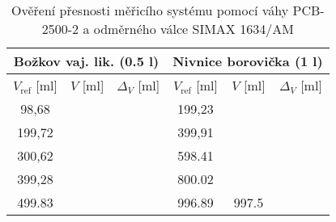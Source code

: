

\begin{table}[h]
    \centering
    \begin{tabular}{|c|c|c|c|c|c|}
        \hline
        \multicolumn{3}{|c|}{Božkov vaj. lik. (0.5 l)} & \multicolumn{3}{c|}{Nivnice borovička (1 l)} \\ \hline
        $V_{\text{ref}}$ [ml] & $V$ [ml] & $\Delta_V$ [ml] & $V_{\text{ref}}$ [ml] & $V$ [ml] & $\Delta_V$ [ml] \\ \hline \hline
        98,68 & & & 199,23 & & \\ \hline
        199,72 & & & 399,91 & & \\ \hline
        300,62 & & & 598.41 & & \\ \hline
        399,28 & & & 800.02 & & \\ \hline
        499.83 & & & 996.89 & 997.5 & \\ \hline
    \end{tabular}
    \caption{Ověření přesnosti měřicího systému pomocí váhy PCB-2500-2 a odměrného válce SIMAX 1634/AM}
    \label{tab:měření objemu}
\end{table}